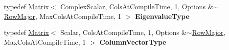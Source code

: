 \begin{DoxyCompactItemize}
typedef \hyperlink{group___core___module_class_eigen_1_1_matrix}{Matrix}$<$ Complex\+Scalar, Cols\+At\+Compile\+Time, 1, Options \&$\sim$\hyperlink{group__enums_ggaacded1a18ae58b0f554751f6cdf9eb13acfcde9cd8677c5f7caf6bd603666aae3}{Row\+Major}, Max\+Cols\+At\+Compile\+Time, 1 $>$ {\bfseries Eigenvalue\+Type}
\item 
\mbox{\label{group___eigenvalues___module_ad7d4f7f6f061e66838a4a1c7666efa52}} 
typedef \hyperlink{group___core___module_class_eigen_1_1_matrix}{Matrix}$<$ Scalar, Cols\+At\+Compile\+Time, 1, Options \&$\sim$\hyperlink{group__enums_ggaacded1a18ae58b0f554751f6cdf9eb13acfcde9cd8677c5f7caf6bd603666aae3}{Row\+Major}, Max\+Cols\+At\+Compile\+Time, 1 $>$ {\bfseries Column\+Vector\+Type}
\end{DoxyCompactItemize}

